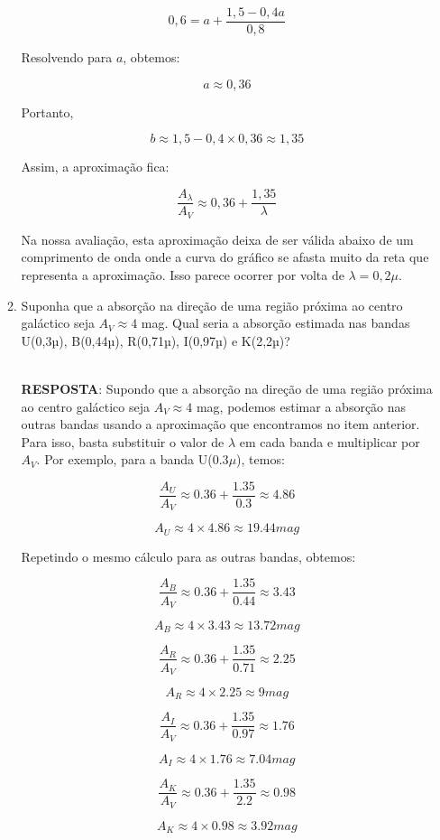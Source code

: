 \documentclass[a4paper,12pt]{article}
\begin{document}
\begin{enumerate}
\begin{enumerate}
$$0,6 = a + \frac{1,5 - 0,4a}{0,8}$$

Resolvendo para $a$, obtemos:

$$a \approx 0,36$$

Portanto,

$$b \approx 1,5 - 0,4 \times 0,36 \approx 1,35$$

Assim, a aproximação fica:

$$\frac{A_\lambda}{A_V} \approx 0,36 + \frac{1,35}{\lambda}$$

Na nossa avaliação, esta aproximação deixa de ser válida abaixo de um comprimento de onda onde a curva do gráfico se afasta muito da reta que representa a aproximação. Isso parece ocorrer por volta de $\lambda = 0,2\mu$.

\noindent\hrulefill

\item Suponha que a absorção na direção de uma região próxima ao centro galáctico seja $A_V\approx 4$ mag. Qual seria a absorção estimada nas bandas U(0,3µ), B(0,44µ), R(0,71µ), I(0,97µ) e K(2,2µ)?

\noindent\hrulefill\\\textbf{RESPOSTA}: Supondo que a absorção na direção de uma região próxima ao centro galáctico seja $A_V \approx 4$ mag, podemos estimar a absorção nas outras bandas usando a aproximação que encontramos no item anterior. Para isso, basta substituir o valor de $\lambda$ em cada banda e multiplicar por $A_V$. Por exemplo, para a banda U($0.3\mu$), temos:

$$\frac{A_U}{A_V} \approx 0.36 + \frac{1.35}{0.3} \approx 4.86$$

$$A_U \approx 4 \times 4.86 \approx 19.44 mag$$

Repetindo o mesmo cálculo para as outras bandas, obtemos:

$$\frac{A_B}{A_V} \approx 0.36 + \frac{1.35}{0.44} \approx 3.43$$

$$A_B \approx 4 \times 3.43 \approx 13.72 mag$$

$$\frac{A_R}{A_V} \approx 0.36 + \frac{1.35}{0.71} \approx 2.25$$

$$A_R \approx 4 \times 2.25 \approx 9 mag$$

$$\frac{A_I}{A_V} \approx 0.36 + \frac{1.35}{0.97} \approx 1.76$$

$$A_I \approx 4 \times 1.76 \approx 7.04 mag$$

$$\frac{A_K}{A_V} \approx 0.36 + \frac{1.35}{2.2} \approx 0.98$$

$$A_K \approx 4 \times 0.98 \approx 3.92 mag$$


\end{enumerate}
\end{enumerate}
\end{document}
